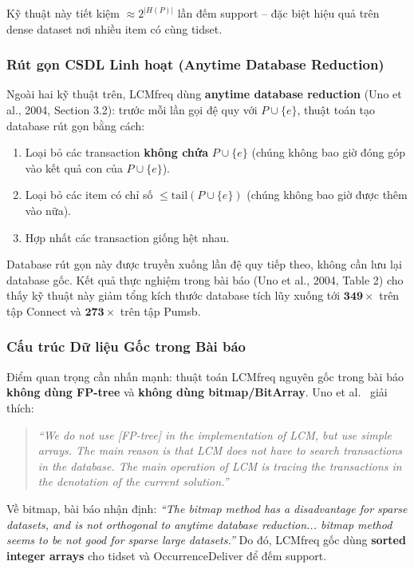 \documentclass[12pt,a4paper]{article}
\theoremstyle{definition}
\begin{document}
Kỹ thuật này tiết kiệm $\approx 2^{|H(P)|}$ lần đếm support -- đặc biệt hiệu quả trên dense dataset nơi nhiều item có cùng tidset.

\subsubsection{Rút gọn CSDL Linh hoạt (Anytime Database Reduction)}

Ngoài hai kỹ thuật trên, LCMfreq dùng \textbf{anytime database reduction} (Uno et al., 2004, Section 3.2): trước mỗi lần gọi đệ quy với $P \cup \{e\}$, thuật toán tạo database rút gọn bằng cách:
\begin{enumerate}
    \item Loại bỏ các transaction \textbf{không chứa} $P \cup \{e\}$ (chúng không bao giờ đóng góp vào kết quả con của $P \cup \{e\}$).
    \item Loại bỏ các item có chỉ số $\leq \mathrm{tail}(P \cup \{e\})$ (chúng không bao giờ được thêm vào nữa).
    \item Hợp nhất các transaction giống hệt nhau.
\end{enumerate}

Database rút gọn này được truyền xuống lần đệ quy tiếp theo, không cần lưu lại database gốc. Kết quả thực nghiệm trong bài báo (Uno et al., 2004, Table 2) cho thấy kỹ thuật này giảm tổng kích thước database tích lũy xuống tới $\mathbf{349\times}$ trên tập Connect và $\mathbf{273\times}$ trên tập Pumsb.

\subsubsection{Cấu trúc Dữ liệu Gốc trong Bài báo}

Điểm quan trọng cần nhấn mạnh: thuật toán LCMfreq nguyên gốc trong bài báo \textbf{không dùng FP-tree} và \textbf{không dùng bitmap/BitArray}. Uno et al.~\cite{uno2004} giải thích:

\begin{quote}
\textit{``We do not use [FP-tree] in the implementation of LCM, but use simple arrays. The main reason is that LCM does not have to search transactions in the database. The main operation of LCM is tracing the transactions in the denotation of the current solution.''}
\end{quote}

Về bitmap, bài báo nhận định: \textit{``The bitmap method has a disadvantage for sparse datasets, and is not orthogonal to anytime database reduction... bitmap method seems to be not good for sparse large datasets.''} Do đó, LCMfreq gốc dùng \textbf{sorted integer arrays} cho tidset và OccurrenceDeliver để đếm support.
\end{document}
